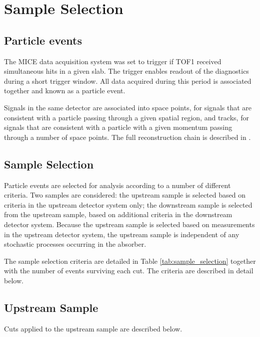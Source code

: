 \section{Sample Selection}
\label{Sect:Cuts-1}

\subsection{Particle events}
The MICE data acquisition system was set to trigger if TOF1 received 
simultaneous hits in a given slab. The trigger enables readout of the 
diagnostics during a short trigger window. All data acquired during this period 
is associated together and known as a particle event. 

Signals in the same detector are associated into space points, for signals that 
are consistent with a particle passing through a given spatial region, and 
tracks, for signals that are consistent with a particle with a given momentum 
passing through a number of space points. The full reconstruction chain is
described in \cite{maus_paper}.

\subsection{Sample Selection}
Particle events are selected for analysis according to a number of different
criteria. Two samples are considered: the upstream sample is selected based on 
criteria in the upstream detector system only; the downstream sample is 
selected from the upstream sample, based on additional criteria in the 
downstream detector system. Because the upstream sample is selected based on
measurements in the upstream detector system, the upstream sample is 
independent of any stochastic processes occurring in the absorber.

The sample selection criteria are detailed in Table \ref{tab:sample_selection}
together with the number of events surviving each cut. The criteria are
described in detail below.

\subsection{Upstream Sample}
Cuts applied to the upstream sample are described below.

